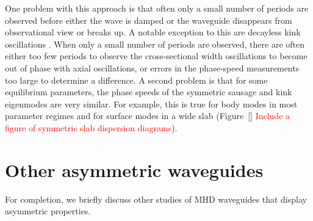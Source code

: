 \documentclass[12pt]{../style-files/ociamthesis}
\begin{document}
One problem with this approach is that often only a small number of periods are observed before either the wave is damped or the waveguide disappears from observational view or breaks up. A notable exception to this are decayless kink oscillations \citep{nis_etal13}. When only a small number of periods are observed, there are often either too few periods to observe the cross-sectional width oscillations to become out of phase with axial oscillations, or errors in the phase-speed measurements too large to determine a difference. A second problem is that for some equilibrium parameters, the phase speeds of the symmetric sausage and kink eigenmodes are very similar. For example, this is true for body modes in most parameter regimes and for surface modes in a wide slab (Figure~\ref{} \textcolor{red}{Include a figure of symmetric slab dispersion diagrams}).

\color{red}


\section{Other asymmetric waveguides}
\label{sec: other waveguides}

For completion, we briefly discuss other studies of MHD waveguides that display asymmetric properties.
\end{document}
